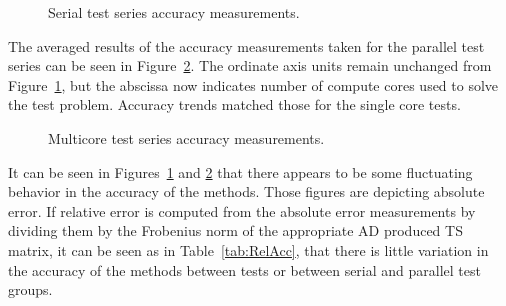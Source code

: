 \documentclass[preprint,12pt]{elsarticle}
\begin{document}
%
\begin{figure}[tbp] 
    \centering
    \scalebox{1.0}{} 
    \caption{Serial test series accuracy measurements.} 
    \label{fig:serial_accuracy} 
\end{figure}
%
The averaged results of the accuracy measurements taken for the parallel test series can be seen in Figure~\ref{fig:multi_accuracy}. The ordinate axis units remain unchanged from Figure~\ref{fig:serial_accuracy}, but the abscissa now indicates number of compute cores used to solve the test problem. Accuracy trends matched those for the single core tests. 
%
\begin{figure}[tbp] 
    \centering
    \scalebox{0.9}{} 
    \caption{Multicore test series accuracy measurements.} 
    \label{fig:multi_accuracy} 
\end{figure}
%
 It can be seen in Figures~\ref{fig:serial_accuracy} and \ref{fig:multi_accuracy} that there appears to be some fluctuating behavior in the accuracy of the methods. Those figures are depicting absolute error. If relative error is computed from the absolute error measurements by dividing them by the Frobenius norm of the appropriate AD produced TS matrix, it can be seen as in Table~\ref{tab:RelAcc}, that there is little variation in the accuracy of the methods between tests or between serial and parallel test groups. 
%
\end{document}

